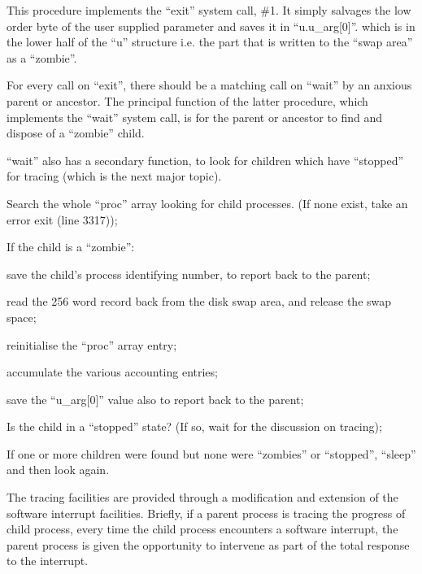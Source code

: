 This procedure implements the ``exit''
system call, \#1. It simply salvages the
low order byte of the user supplied
parameter and saves it in ``u.u\_arg[0]''.
which is in the lower half of the ``u''
structure i.e. the part that is written
to the ``swap area'' as a ``zombie''.



For every call on ``exit'', there should
be a matching call on ``wait'' by an
anxious parent or ancestor. The principal
function of the latter procedure, which
implements the ``wait'' system call, is
for the parent or ancestor to find and
dispose of a ``zombie'' child.

``wait'' also has a secondary function,
to look for children which have
``stopped'' for tracing (which is the
next major topic).

\bd
\item[3277:] Search the whole ``proc'' array
 looking for child processes. (If
none exist, take an error exit (line 3317));
\item[3280:] If the child is a ``zombie'':

\bi
\item save the child's process identifying number, to report back to
the parent;

\item read the 256 word record back from the disk swap area, and release
the swap space;

\item reinitialise the ``proc'' array entry;

\item accumulate the various accounting entries;

save the ``u\_arg[0]'' value also to
report back to the parent;
\ei

\item[3300:] Is the child in a ``stopped''
 state? (If so, wait for the discussion on tracing);

\item[3313:] If one or more children were
 found but none were ``zombies'' or
 ``stopped'', ``sleep'' and then look
 again.
\ed


The tracing facilities are provided
through a modification and extension of
the software interrupt facilities.
Briefly, if a parent process is tracing
the progress of child process, every
time the child process encounters a
software interrupt, the parent process
is given the opportunity to intervene
as part of the total response to the
interrupt.

